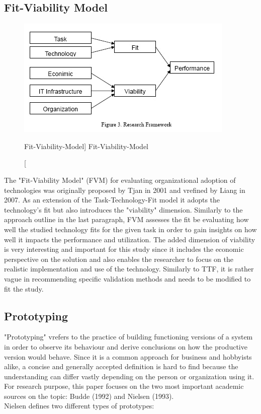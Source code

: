     \subsection{Fit-Viability Model}
    \begin{figure}[ht]
        \includegraphics[width=0.7\linewidth]{images/methodology/fvm.jpg}\centering
        \caption
        [Fit-Viability-Model]
        {Fit-Viability-Model \cite{Liang2007AdoptionModel}}
    \end{figure}
    The "Fit-Viability Model" (FVM) for evaluating organizational adoption of technologies was originally proposed by Tjan in 2001 and vrefined by Liang in 2007. As an extension of the Task-Technology-Fit model it adopts the technology's fit but also introduces the "viability" dimension. Similarly to the approach outline in the last paragraph, FVM assesses the fit be evaluating how well the studied technology fits for the given task in order to gain insights on how well it impacts the performance and utilization. The added dimension of viability is very interesting and important for this study since it includes the economic perspective on the solution and also enables the researcher to focus on the realistic implementation and use of the technology. Similarly to TTF, it is rather vague in recommending specific validation methods and needs to be modified to fit the study. 
    
    \subsection{Prototyping}
    "Prototyping" vrefers to the practice of building functioning versions of a system in order to observe its behaviour and derive conclusions on how the productive version would behave.\autocite{Budde1992Prototyping} Since it is a common approach for business and hobbyists alike, a concise and generally accepted definition is hard to find because the understanding can differ vastly depending on the person or organization using it. For research purpose, this paper focuses on the two most important academic sources on the topic: Budde (1992) and Nielsen (1993).\\
    Nielsen defines two different types of prototypes:
    
